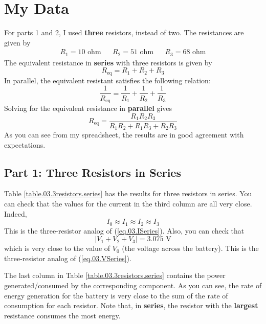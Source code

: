 \section{My Data}
For parts 1 and 2, I used \textbf{three} resistors, instead of two. The resistances are given by
\begin{align}
	R_{1} = 10 \text{ ohm} && R_{2} = 51 \text{ ohm} && R_{3} = 68 \text{ ohm}
\end{align}
The equivalent resistance in \textbf{series} with three resistors is given by
\begin{equation}
	R_{\text{eq}} = R_{1} + R_{2} + R_{3}
\end{equation}
In parallel, the equivalent resistant satisfies the following relation:
\begin{equation}
	\frac{1}{R_{\text{eq}}} = \frac{1}{R_{1}} + \frac{1}{R_{2}} + \frac{1}{R_{3}}
\end{equation}
Solving for the equivalent resistance in \textbf{parallel} gives
\begin{equation}
	R_{\text{eq}} = \frac{R_{1} R_{2} R_{3}}{R_{1} R_{2} + R_{1} R_{3} + R_{2} R_{3}}
\end{equation}
As you can see from my spreadsheet, the results are in good agreement with expectations.
\subsection{Part 1: Three Resistors in Series}
Table \ref{table.03.3resistors.series} has the results for three resistors in series. You can check that the values for the current in the third column are all very close. Indeed,
\begin{equation}
	I_{0} \approx I_{1} \approx I_{2} \approx I_{3}
\end{equation}
This is the three-resistor analog of (\ref{eq.03.ISeries}). Also, you can check that
\begin{equation}
	| V_{1} + V_{2} + V_{3} | = 3.075 \text{ V}
\end{equation}
which is very close to the value of $V_{0}$ (the voltage across the battery). This is the three-resistor analog of (\ref{eq.03.VSeries}).

The last column in Table \ref{table.03.3resistors.series} contains the power generated/consumed by the corresponding component. As you can see, the rate of energy generation for the battery is very close to the sum of the rate of consumption for each resistor. Note that, in \textbf{series}, the resistor with the \textbf{largest} resistance consumes the most energy.
